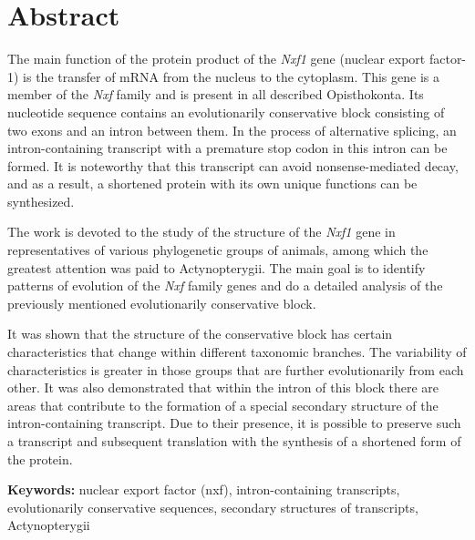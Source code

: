 \clearpage
\section{Abstract}

The main function of the protein product of the \textit{Nxf1} gene (nuclear export factor-1) is the transfer of mRNA from the nucleus to the cytoplasm. This gene is a member of the \textit{Nxf} family and is present in all described Opisthokonta. Its nucleotide sequence contains an evolutionarily conservative block consisting of two exons and an intron between them. In the process of alternative splicing, an intron-containing transcript with a premature stop codon in this intron can be formed. It is noteworthy that this transcript can avoid nonsense-mediated decay, and as a result, a shortened protein with its own unique functions can be synthesized.

The work is devoted to the study of the structure of the \textit{Nxf1} gene in representatives of various phylogenetic groups of animals, among which the greatest attention was paid to Actynopterygii. The main goal is to identify patterns of evolution of the \textit{Nxf} family genes and do a detailed analysis of the previously mentioned evolutionarily conservative block.

It was shown that the structure of the conservative block has certain characteristics that change within different taxonomic branches. The variability of characteristics is greater in those groups that are further evolutionarily from each other. It was also demonstrated that within the intron of this block there are areas that contribute to the formation of a special secondary structure of the intron-containing transcript. Due to their presence, it is possible to preserve such a transcript and subsequent translation with the synthesis of a shortened form of the protein.

\vspace{1em}

\textbf{Keywords:} nuclear export factor (nxf), intron-containing transcripts, evolutionarily conservative sequences, secondary structures of transcripts, Actynopterygii